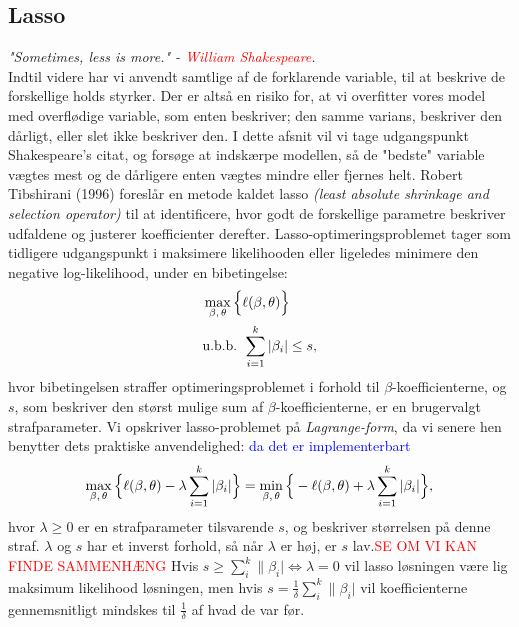 \documentclass[11pt,a4paper]{article}
\begin{document}
\subsection{Lasso}
\textit{"Sometimes, less is more." - \textcolor{red}{William Shakespeare}.}\\
Indtil videre har vi anvendt samtlige af de forklarende variable, til at beskrive de forskellige holds styrker. Der er altså en risiko for, at vi overfitter vores model med overflødige variable, som enten beskriver; den samme varians, beskriver den dårligt, eller slet ikke beskriver den. I dette afsnit vil vi tage udgangspunkt Shakespeare's citat, og forsøge at indskærpe modellen, så de "bedste" variable vægtes mest og de dårligere enten vægtes mindre eller fjernes helt. Robert Tibshirani (1996)\cite{RobertTibshirani} foreslår en metode kaldet lasso \textit{(least absolute shrinkage and selection operator)} til at identificere, hvor godt de forskellige parametre beskriver udfaldene og justerer koefficienter derefter. Lasso-optimeringsproblemet tager som tidligere udgangspunkt i maksimere likelihooden eller ligeledes minimere den negative log-likelihood, under en bibetingelse:
\begin{align*}
&\max_{\beta,\,\theta} \Big{\{}\ell(\beta,\theta)\Big{\}} \\
&\text{u.b.b. }\sum_{i=1}^k|\beta_i|\leq s,
\end{align*}
hvor bibetingelsen straffer optimeringsproblemet i forhold til $\beta$-koefficienterne, og $s$, som beskriver den størst mulige sum af $\beta$-koefficienterne, er en brugervalgt strafparameter. 
Vi opskriver lasso-problemet på \textit{Lagrange-form}, da vi senere hen benytter dets praktiske anvendelighed:\textcolor{blue}{ da det er implementerbart}
\begin{align*}
\max_{\beta,\,\theta} \Big{\{}\ell(\beta,\theta)-\lambda\sum_{i=1}^k|\beta_i|\Big{\}}=\min_{\beta,\,\theta} \Big{\{}-\ell(\beta,\theta)+\lambda\sum_{i=1}^k|\beta_i|\Big{\}},
\end{align*}
hvor $\lambda\geq0$ er en strafparameter tilsvarende $s$, og beskriver størrelsen på denne straf. $\lambda$ og $s$ har et inverst forhold, så når $\lambda$ er høj, er $s$ lav.\textcolor{red}{SE OM VI KAN FINDE SAMMENHÆNG} Hvis $s\geq\sum_i^k\|\beta_i|\iff \lambda=0$ vil lasso løsningen være lig maksimum likelihood løsningen, men hvis $s=\frac{1}{\delta}\sum_i^k\|\beta_i|$ vil koefficienterne gennemsnitligt mindskes til $\frac{1}{\delta}$ af hvad de var før.
\end{document}
